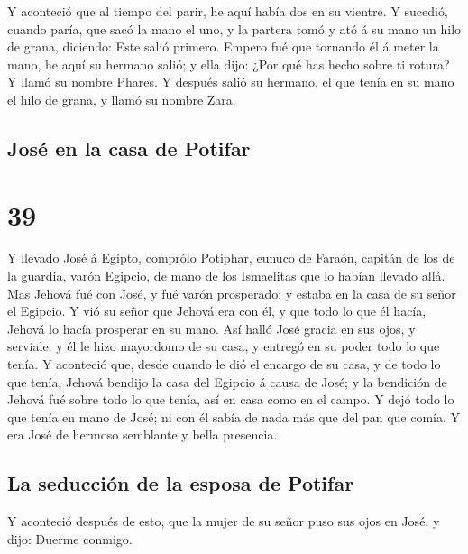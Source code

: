  Y aconteció que al tiempo del parir, he aquí había dos
en su vientre.  Y sucedió, cuando paría, que sacó la mano
el uno, y la partera tomó y ató á su mano un hilo de grana, diciendo:
Este salió primero.  Empero fué que tornando él á meter
la mano, he aquí su hermano salió; y ella dijo: ¿Por qué has hecho sobre
ti rotura? Y llamó su nombre Phares.  Y después salió su
hermano, el que tenía en su mano el hilo de grana, y llamó su nombre
Zara.

\hypertarget{josuxe9-en-la-casa-de-potifar}{%
\subsection{José en la casa de
Potifar}\label{josuxe9-en-la-casa-de-potifar}}

\hypertarget{section-38}{%
\section{39}\label{section-38}}

 Y llevado José á Egipto, comprólo Potiphar, eunuco de
Faraón, capitán de los de la guardia, varón Egipcio, de mano de los
Ismaelitas que lo habían llevado allá.  Mas Jehová fué con
José, y fué varón prosperado: y estaba en la casa de su señor el
Egipcio.  Y vió su señor que Jehová era con él, y que todo
lo que él hacía, Jehová lo hacía prosperar en su mano. 
Así halló José gracia en sus ojos, y servíale; y él le hizo mayordomo de
su casa, y entregó en su poder todo lo que tenía.  Y
aconteció que, desde cuando le dió el encargo de su casa, y de todo lo
que tenía, Jehová bendijo la casa del Egipcio á causa de José; y la
bendición de Jehová fué sobre todo lo que tenía, así en casa como en el
campo.  Y dejó todo lo que tenía en mano de José; ni con
él sabía de nada más que del pan que comía. Y era José de hermoso
semblante y bella presencia.

\hypertarget{la-seducciuxf3n-de-la-esposa-de-potifar}{%
\subsection{La seducción de la esposa de
Potifar}\label{la-seducciuxf3n-de-la-esposa-de-potifar}}

 Y aconteció después de esto, que la mujer de su señor
puso sus ojos en José, y dijo: Duerme conmigo.

